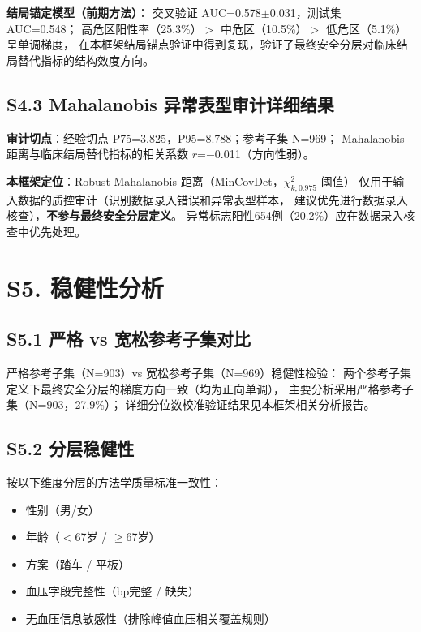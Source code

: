 \documentclass[12pt, a4paper]{ctexart}
\begin{document}
\textbf{结局锚定模型（前期方法）}：
交叉验证 AUC=0.578$\pm$0.031，测试集 AUC=0.548；
高危区阳性率（25.3\%）$>$ 中危区（10.5\%）$>$ 低危区（5.1\%）呈单调梯度，
在本框架结局锚点验证中得到复现，验证了最终安全分层对临床结局替代指标的结构效度方向。

\subsection*{S4.3 Mahalanobis 异常表型审计详细结果}

\textbf{审计切点}：经验切点 P75=3.825，P95=8.788；参考子集 N=969；
Mahalanobis 距离与临床结局替代指标的相关系数 $r$=$-$0.011（方向性弱）。

\textbf{本框架定位}：Robust Mahalanobis 距离（MinCovDet，$\chi^2_{k,0.975}$ 阈值）
仅用于输入数据的质控审计（识别数据录入错误和异常表型样本，
建议优先进行数据录入核查），\textbf{不参与最终安全分层定义}。
异常标志阳性654例（20.2\%）应在数据录入核查中优先处理。

\section*{S5. 稳健性分析}

\subsection*{S5.1 严格 vs 宽松参考子集对比}

严格参考子集（N=903）vs 宽松参考子集（N=969）稳健性检验：
两个参考子集定义下最终安全分层的梯度方向一致（均为正向单调），
主要分析采用严格参考子集（N=903，27.9\%）；
详细分位数校准验证结果见本框架相关分析报告。

\subsection*{S5.2 分层稳健性}

按以下维度分层的方法学质量标准一致性：
\begin{itemize}
  \item 性别（男/女）
  \item 年龄（$<$67岁 / $\geq$67岁）
  \item 方案（踏车 / 平板）
  \item 血压字段完整性（bp完整 / 缺失）
  \item 无血压信息敏感性（排除峰值血压相关覆盖规则）
\end{itemize}
\end{document}
